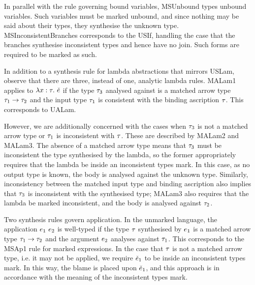 In parallel with the rule governing bound variables, MSUnbound types unbound variables. Such
variables must be marked unbound, and since nothing may be said about their types, they synthesise
the unknown type. MSInconsistentBranches corresponds to the USIf, handling the case that the
branches synthesise inconsistent types and hence have no join. Such forms are required to be marked
as such.




In addition to a synthesis rule for lambda abstractions that mirrors USLam, observe that there are
three, instead of one, analytic lambda rules. MALam1 applies to $\lambda x : \tau. ~\check{e}$ if the type
$\tau_3$ analysed against is a matched arrow type $\tau_1 \to \tau_2$ and the input type
$\tau_1$ is consistent with the binding ascription $\tau$. This corresponds to UALam.

However, we are additionally concerned with the cases when $\tau_3$ is not a matched arrow type or
$\tau_1$ is inconsistent with $\tau$. These are described by MALam2 and MALam3. The absence of a
matched arrow type means that $\tau_3$ must be inconsistent the type synthesised by the lambda, so
the former appropriately requires that the lambda be inside an inconsistent types mark. In this
case, as no output type is known, the body is analysed against the unknown type. Similarly,
inconsistency between the matched input type and binding ascription also implies that $\tau_3$ is
inconsistent with the synthesised type; MALam3 also requires that the lambda be marked inconsistent,
and the body is analysed against $\tau_2$.


Two synthesis rules govern application. In the unmarked language, the application
$e_1 ~e_2$ is well-typed if the type $\tau$ synthesised by $e_1$ is a matched arrow
type $\tau_1 \to \tau_2$ and the argument $e_2$ analyses against $\tau_1$. This corresponds
to the MSAp1 rule for marked expressions. In the case that $\tau$ is not a matched arrow type, i.e.
it may not be applied, we require $\check{e}_1$ to be inside an inconsistent types mark. In this way, the
blame is placed upon $\check{e}_1$, and this approach is in accordance with the meaning of the
inconsistent types mark.

